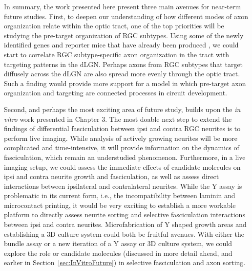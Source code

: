 In summary, the work presented here present three main avenues for near-term future studies.
First, to deepen our understanding of how different modes of axon organization relate within the optic tract, one of the top priorities will be studying the pre-target organization of RGC subtypes.
Using some of the newly identified genes and reporter mice that have already been produced \cite{rivlin2011transgenic}, we could start to correlate RGC subtype-specific axon organization in the tract with targeting patterns in the dLGN.
Perhaps axons from RGC subtypes that target diffusely across the dLGN are also spread more evenly through the optic tract.
Such a finding would provide more support for a model in which pre-target axon organization and targeting are connected processes in circuit development.

Second, and perhaps the most exciting area of future study, builds upon the \emph{in vitro} work presented in Chapter 3.
The most doable next step to extend the findings of differential fasciculation between ipsi and contra RGC neurites is to perform live imaging.
While analysis of actively growing neurites will be more complicated and time-intensive, it will provide information on the dynamics of fasciculation, which remain an understudied phenomenon.
Furthermore, in a live imaging setup, we could assess the immediate effects of candidate molecules on ipsi and contra neurite growth and fasciculation, as well as assess direct interactions between ipsilateral and contralateral neurites.
While the Y assay is problematic in its current form, i.e., the incompatibility between laminin and microcontact printing, it would be very exciting to establish a more workable platform to directly assess neurite sorting and selective fasciculation interactions between ipsi and contra neurites.
Microfabrication of Y shaped growth areas and establishing a 3D culture system could both be fruitful avenues.
With either the bundle assay or a new iteration of a Y assay or 3D culture system, we could explore the role or candidate molecules (discussed in more detail ahead, and earlier in Section~\ref{sec:InVitroFuture}) in selective fasciculation and axon sorting.

